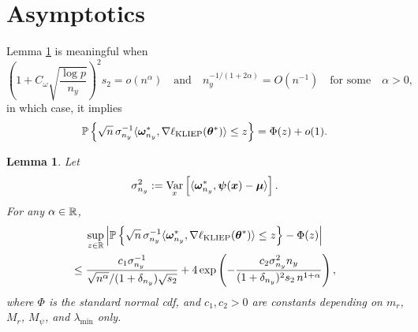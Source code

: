\documentclass[11pt]{article}
\numberwithin{equation}{section}
\numberwithin{theorem}{section}
\def\fatx{\boldsymbol{x}}
\def\fatmu{\boldsymbol{\mu}}
\def\fattheta{\boldsymbol{\theta}}
\def\fatpsi{\boldsymbol{\psi}}
\def\fatomega{\boldsymbol{\omega}}
\newtheorem{lem}{Lemma}[section]
\theoremstyle{definition}
\theoremstyle{remark}
\begin{document}
\section{Asymptotics} \label{app:asymp}

Lemma \ref{lem:Berry_Esseen_CLT} is meaningful when
\begin{equation}
\left( 1+C_\omega \sqrt{\frac{\log p}{n_y}} \right)^2 s_2 = o(n^\alpha)
\quad\text{and}\quad
n_y^{-1 / (1+2\alpha)} = O(n^{-1})
\quad\text{for some}\quad
\alpha > 0,
\end{equation}
in which case, it implies
\begin{equation}
\PP\left\{ \sqrt{n} \, \sigma_{n_y}^{-1} \langle \fatomega_{n_y}^*, \nabla \ell_\text{KLIEP}(\fattheta^*) \rangle \leq z \right\}
= \Phi(z) + o(1).
\end{equation}

\begin{lem} \label{lem:Berry_Esseen_CLT}
Let
\begin{equation}
\sigma_{n_y}^2
:= \Var_x \left[ \langle \fatomega_{n_y}^*, \fatpsi(\fatx) - \fatmu \rangle \right].
\end{equation}
For any $\alpha \in \mathbb{R}$,
\begin{multline}
\sup_{z \in \RR} \left| \PP\left\{ \sqrt{n} \, \sigma_{n_y}^{-1} \langle \fatomega_{n_y}^*, \nabla \ell_\text{KLIEP}(\fattheta^*) \rangle \leq z \right\} - \Phi(z) \right| \\
\leq \frac{c_1 \sigma_{n_y}^{-1}}{\sqrt{n^\alpha} / (1+\delta_{n_y}) \sqrt{s_2}} + 4 \exp\left( -\frac{c_2 \sigma_{n_y}^2 n_y}{(1+\delta_{n_y})^2 s_2 \, n^{1+\alpha}} \right),
\end{multline}
where $\Phi$ is the standard normal cdf, and $c_1, c_2 > 0$ are constants depending on $m_r$, $M_r$, $M_\psi$, and $\lambda_{\min}$ only.
\end{lem}
\end{document}
